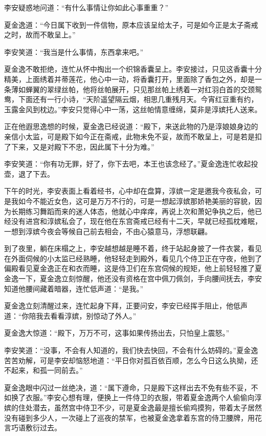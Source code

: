 李安疑惑地问道：“有什么事情让你如此心事重重？”

夏金逸道：“今日属下收到一件信物，原本应该呈给太子，可是如今正是太子斋戒之时，故而不敢呈上。”

李安笑道：“我当是什么事情，东西拿来吧。”

夏金逸不敢拒绝，连忙从怀中掏出一个织锦香囊呈上。李安接过，只见这香囊十分精美，上面绣着并蒂莲花，他心中一动，将香囊打开，里面除了香包之外，却是一条薄如蝉翼的翠绿丝帕，他将丝帕展开，只见那丝帕上绣着一对红羽白首的交颈鸳鸯，下面还有一行小诗，“天阶遥望隔云烟，相思几重残月天。今宵红豆重有约，玉露金风到枕边。”李安只觉得心中一荡，这丝帕情意缠绵，莫非是淳嫔托人送来。

正在他遐思逸想的时候，夏金逸已经说道：“殿下，来送此物的乃是淳娘娘身边的亲信小太监，可是殿下如今正在斋戒，此物未免不妥，故而不敢呈上，可是若是扣了下来，又是对殿下不忠，因此属下十分为难。”

李安笑道：“你有功无罪，好了，你下去吧，本王也该念经了。”夏金逸连忙收起投壶，退了下去。

下午的时光，李安表面上看着经书，心中却在盘算，淳嫔一定是邀我今夜私会，可是我如今不能近女色，这可是万万不行的，可是一想起淳嫔那娇艳美丽的容貌，因为长期练习舞蹈而来的迷人体态，他就心中痒痒，再说上次和萧妃争执之后，他已经没有进宫和淳嫔私会了，现在他在东宫斋戒已经有十二天，早就已经孤枕难眠，一想到淳嫔今夜会等候自己前去相会，不由心猿意马，浮想联翩。

到了夜里，躺在床榻之上，李安越想越是睡不着，终于站起身披了一件衣裳，看见在外面伺候的小太监已经熟睡，他轻轻走到殿外，看见几个侍卫正在守夜，他到了偏殿看见夏金逸正在和衣而睡，这是侍卫们在东宫伺候的规矩，他上前轻轻推了夏金逸一下，夏金逸立刻惊醒，他还没有资格在宫中佩刀佩剑，手向腰间抚去，李安知道他腰间藏着暗器，连忙低声道：“是我。”

夏金逸立刻清醒过来，连忙起身下拜，正要问安，李安已经挥手阻止，他低声道：“你陪我去看看淳嫔，别惊动了外人。”

夏金逸大惊道：“殿下，万万不可，这事如果传扬出去，只怕皇上震怒。”

李安笑道：“没事，不会有人知道的，我们快去快回，不会有什么妨碍的。”夏金逸苦苦劝解，可是李安却恼怒地道：“平日你对孤百依百顺，怎么今日这么执拗，还不起来，和孤一同前去。”

夏金逸眼中闪过一丝绝决，道：“属下遵命，只是殿下这样出去不免有些不妥，不如换了衣服。”李安心想有理，便换上一件侍卫的衣服，带着夏金逸两个人偷偷向淳嫔的住处潜去，虽然宫中侍卫不少，可是夏金逸最是擅长偷鸡摸狗，带着太子居然没有碰到多少人，一次碰上了巡夜的禁军，也被夏金逸拿着东宫的侍卫腰牌，用花言巧语敷衍过去。

